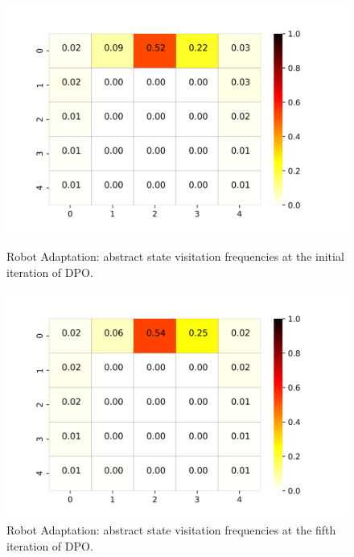 \begin{figure}[h!]
	\centering
	\begin{minipage}[t]{.45\columnwidth}
		\includegraphics[width=\textwidth]{plots/colormap0.png}
		\caption{Robot Adaptation: abstract state visitation frequencies at the initial iteration of \ac{DPO}.}
		\label{fig:cm0}
	\end{minipage}%
	\hfill
	\begin{minipage}[t]{.45\columnwidth}
		\includegraphics[width=\textwidth]{plots/colormap5.png}
		\caption{Robot Adaptation: abstract state visitation frequencies at the fifth iteration of \ac{DPO}.}
		\label{fig:cm5}
	\end{minipage}
\end{figure}
